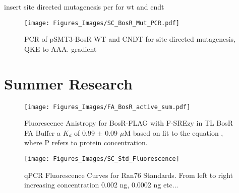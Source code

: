 \documentclass[12pt,twoside]{reedthesis}
\begin{document}
   insert site directed mutagenesis pcr for wt and cndt
   
    		 \begin{figure}[h!tbp]
    		 	\centering
    		 	\texttt{[image: Figures\_Images/SC\_BosR\_Mut\_PCR.pdf]}
    		 	\caption[BosR QKE --> AAA Site Directied Mutagenesis PCR Gel]{PCR of pSMT3-BosR WT and CNDT for site directed mutagenesis, QKE to AAA. gradient}
    		 	\label{BosRmutPCR}
    		 \end{figure}
  
   
\appendix
\chapter{Summer Research} 
   
           	\begin{figure}[h]
           		\centering
           		\texttt{[image: Figures\_Images/FA\_BosR\_active\_sum.pdf]}
           		\caption[Determining DNA Activity of BosR-FLAG by Fluorescence Anistropy]{Fluorescence Anistropy for BosR-FLAG with F-SREzy in TL BosR FA Buffer  a $K_{d}$ of 0.99 $\pm$ 0.09 $\mu$M based on fit to the equation \FAstdfit , where P refers to protein concentration.}
           		\label{BosRFLAGFAactive}
           	\end{figure}
           	
           	
       		 \begin{figure}[h!tbp]
       		 	\centering
       		 	\texttt{[image: Figures\_Images/SC\_Std\_Fluorescence]}
       		 	\caption[qPCR Fluorescence Curves for Ran76 Standards]{qPCR Fluorescence Curves for Ran76 Standards. From left to right increasing concentration 0.002 ng, 0.0002 ng etc...}
       		 	\label{qPCRRan76Stds}
       		 \end{figure}
       		 
\end{document}
